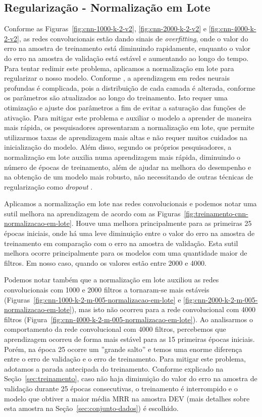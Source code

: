 \subsection{Regularização - Normalização em Lote}
\label{sec:regularizacao-normalizacao-lote}

Conforme as Figuras~\ref{fig:cnn-1000-k-2-v2}, \ref{fig:cnn-2000-k-2-v2} e \ref{fig:cnn-4000-k-2-v2}, as redes convolucionais estão dando sinais de \textit{overfitting}, onde o valor do erro na amostra de treinamento está diminuindo rapidamente, enquanto o valor do erro na amostra de validação está estável e aumentando ao longo do tempo. Para tentar redimir este problema, aplicamos a normalização em lote para regularizar o nosso modelo. Conforme \cite{sergey-batch-normalization-2015}, a aprendizagem em redes neurais profundas é complicada, pois a distribuição de cada camada é alterada, conforme os parâmetros são atualizados ao longo do treinamento. Isto requer uma otimização e ajuste dos parâmetros a fim de evitar a saturação das funções de ativação. Para mitigar este problema e auxiliar o modelo a aprender de maneira mais rápida, os pesquisadores apresentaram a normalização em lote, que permite utilizarmos taxas de aprendizagem mais altas e não requer muitos cuidados na inicialização do modelo. Além disso, segundo os próprios pesquisadores, a normalização em lote auxilia numa aprendizagem mais rápida, diminuindo o número de épocas de treinamento, além de ajudar na melhora do desempenho e na obtenção de um modelo mais robusto, não necessitando de outras técnicas de regularização como \textit{dropout} \citep{sergey-batch-normalization-2015}.

Aplicamos a normalização em lote nas redes convolucionais e podemos notar uma sutil melhora na aprendizagem de acordo com as Figuras~\ref{fig:treinamento-cnn-normalizacao-em-lote}. Houve uma melhora principalmente para as primeiras 25 épocas iniciais, onde há uma leve diminuição entre o valor do erro na amostra de treinamento em comparação com o erro na amostra de validação. Esta sutil melhora ocorre principalmente para os modelos com uma quantidade maior de filtros. Em nosso caso, quando os valores estão entre 2000 e 4000.

Podemos notar também que a normalização em lote auxiliou as redes convolucionais com 1000 e 2000 filtros a tornaram-se mais estáveis (Figuras~\ref{fig:cnn-1000-k-2-m-005-normalizacao-em-lote} e \ref{fig:cnn-2000-k-2-m-005-normalizacao-em-lote}), mas isto não ocorreu para a rede convolucional com 4000 filtros (Figura~\ref{fig:cnn-4000-k-2-m-005-normalizacao-em-lote}). Ao analisarmos o comportamento da rede convolucional com 4000 filtros, percebemos que aprendizagem ocorreu de forma mais estável para as 15 primeiras épocas iniciais. Porém, na época 25 ocorre um ''grande salto'' e temos uma enorme diferença entre o erro de validação e o erro de treinamento. Para mitigar este problema, adotamos a parada antecipada do treinamento. Conforme explicado na Seção~\ref{sec:treinamento}, caso não haja diminuição do valor do erro na amostra de validação durante 25 épocas consecutivas, o treinamento é interrompido e o modelo que obtiver a maior média MRR na amostra DEV (mais detalhes sobre esta amostra na Seção~\ref{sec:conjunto-dados}) é escolhido.

